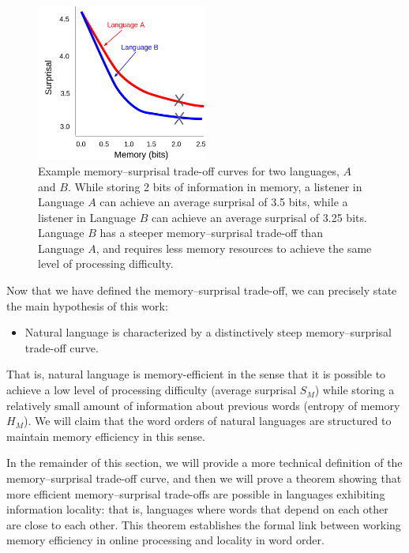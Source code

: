 \begin{figure}
\centering
\includegraphics[width=0.5\textwidth]{figures-gdrive/tradeoff.png}
\caption{Example memory--surprisal trade-off curves for two languages, $A$ and $B$. While storing 2 bits of information in memory, a listener in Language $A$ can achieve an average surprisal of 3.5 bits, while a listener in Language $B$ can achieve an average surprisal of 3.25 bits. Language $B$ has a steeper memory--surprisal trade-off than Language $A$, and requires less memory resources to achieve the same level of processing difficulty.}
\label{fig:examples}
\end{figure}

Now that we have defined the memory--surprisal trade-off, we can precisely state the main hypothesis of this work:
\begin{itemize}
    \item {} Natural language is characterized by a distinctively steep memory--surprisal trade-off curve.
\end{itemize}
That is, natural language is memory-efficient in the sense that it is possible to achieve a low level of processing difficulty (average surprisal $S_M$) while storing a relatively small amount of information about previous words (entropy of memory $H_M$). We will claim that the word orders of natural languages are structured to maintain memory efficiency in this sense.

In the remainder of this section, we will provide a more technical definition of the memory--surprisal trade-off curve, and then we will prove a theorem showing that more efficient memory--surprisal trade-offs are possible in languages exhibiting information locality: that is, languages where words that depend on each other are close to each other. This theorem establishes the formal link between working memory efficiency in online processing and locality in word order.

